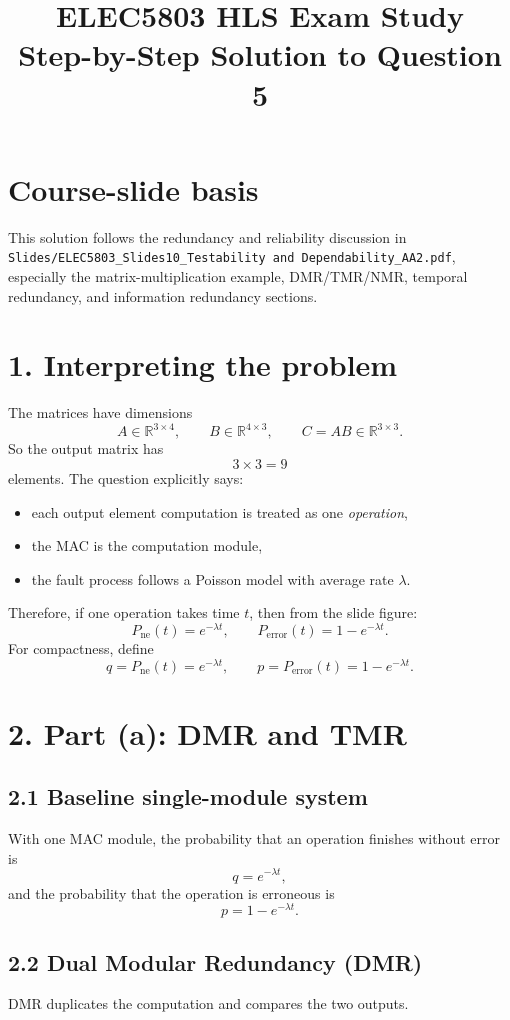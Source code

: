 \documentclass[11pt,a4paper]{article}
\title{ELEC5803 HLS Exam Study\\Step-by-Step Solution to Question 5}
\author{}
\date{}
\begin{document}
\maketitle

\section*{Course-slide basis}
This solution follows the redundancy and reliability discussion in
\texttt{Slides/ELEC5803\_Slides10\_Testability and Dependability\_AA2.pdf}, especially the matrix-multiplication example, DMR/TMR/NMR, temporal redundancy, and information redundancy sections.

\section*{1. Interpreting the problem}
The matrices have dimensions
\[
A\in \mathbb{R}^{3\times 4},\qquad B\in \mathbb{R}^{4\times 3},\qquad C=AB\in \mathbb{R}^{3\times 3}.
\]
So the output matrix has
\[
3\times 3=9
\]
elements. The question explicitly says:
\begin{itemize}
  \item each output element computation is treated as one \emph{operation},
  \item the MAC is the computation module,
  \item the fault process follows a Poisson model with average rate $\lambda$.
\end{itemize}

Therefore, if one operation takes time $t$, then from the slide figure:
\[
P_{\text{ne}}(t)=e^{-\lambda t},\qquad
P_{\text{error}}(t)=1-e^{-\lambda t}.
\]
For compactness, define
\[
q=P_{\text{ne}}(t)=e^{-\lambda t},\qquad p=P_{\text{error}}(t)=1-e^{-\lambda t}.
\]

\section*{2. Part (a): DMR and TMR}
\subsection*{2.1 Baseline single-module system}
With one MAC module, the probability that an operation finishes without error is
\[
q=e^{-\lambda t},
\]
and the probability that the operation is erroneous is
\[
p=1-e^{-\lambda t}.
\]

\subsection*{2.2 Dual Modular Redundancy (DMR)}
DMR duplicates the computation and compares the two outputs.
\end{document}
